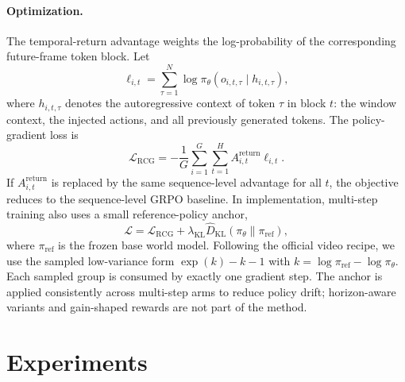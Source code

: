 \documentclass[letterpaper]{article} %
\begin{document}
\paragraph{Optimization.}
The temporal-return advantage weights the log-probability of the corresponding future-frame token block. Let
\begin{equation}
\ell_{i,t}
=
\sum_{\tau=1}^{N}
\log
\pi_{\theta}
\left(o_{i,t,\tau}\mid h_{i,t,\tau}\right),
\end{equation}
where $h_{i,t,\tau}$ denotes the autoregressive context of token $\tau$ in block $t$: the window context, the injected actions, and all previously generated tokens. The policy-gradient loss is
\begin{equation}
\mathcal{L}_{\mathrm{RCG}}
=
-\frac{1}{G}
\sum_{i=1}^{G}
\sum_{t=1}^{H}
A_{i,t}^{\mathrm{return}}\ell_{i,t}.
\end{equation}
If $A_{i,t}^{\mathrm{return}}$ is replaced by the same sequence-level advantage for all $t$, the objective reduces to the sequence-level GRPO baseline. In implementation, multi-step training also uses a small reference-policy anchor,
\begin{equation}
\mathcal{L}
=
\mathcal{L}_{\mathrm{RCG}}
+
\lambda_{\mathrm{KL}}
\widehat{D}_{\mathrm{KL}}
\left(\pi_\theta\|\pi_{\mathrm{ref}}\right),
\end{equation}
where $\pi_{\mathrm{ref}}$ is the frozen base world model. Following the official video recipe, we use the sampled low-variance form $\exp(k)-k-1$ with $k=\log\pi_{\mathrm{ref}}-\log\pi_\theta$. Each sampled group is consumed by exactly one gradient step. The anchor is applied consistently across multi-step arms to reduce policy drift; horizon-aware variants and gain-shaped rewards are not part of the method.

\section{Experiments}
\end{document}
